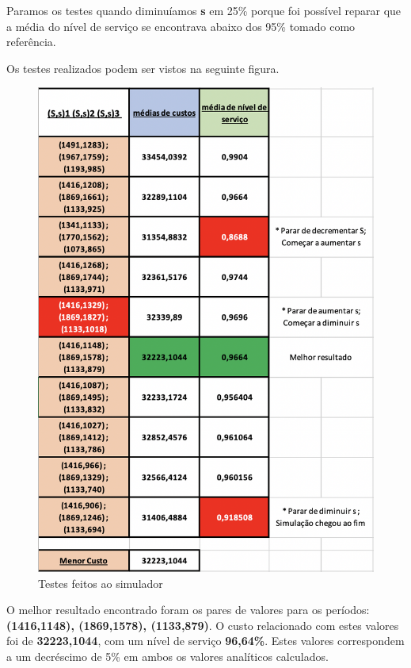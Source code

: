 \documentclass[a4paper]{article}
\begin{document}
Paramos os testes quando diminuíamos \textbf{s} em 25\% porque foi possível reparar que a média do nível de serviço se encontrava abaixo dos 95\% tomado como referência.

Os testes realizados podem ser vistos na seguinte figura.

\begin{figure}[H]
\centering
\includegraphics[scale=0.56]{testes.png}
\caption{Testes feitos ao simulador}
\label{img:testes}
\end{figure}

O melhor resultado encontrado foram os pares de valores para os períodos: \textbf{(1416,1148), (1869,1578), (1133,879)}. O custo relacionado com estes valores foi de \textbf{32223,1044}, com um nível de serviço \textbf{96,64\%}. Estes valores correspondem a um decréscimo de 5\% em ambos os valores analíticos calculados.
\end{document}
